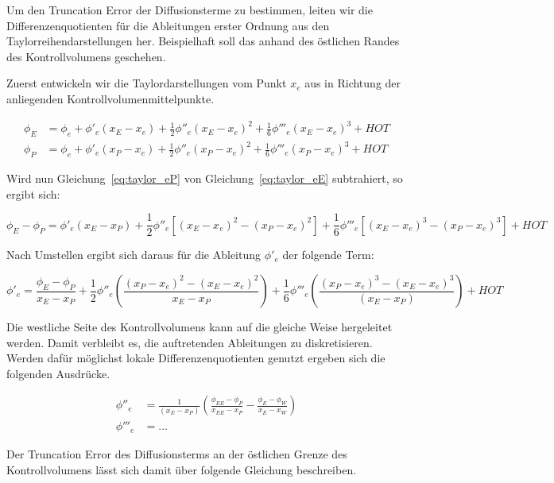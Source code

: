 \documentclass[10pt, ngerman,colorback,accentcolor=tud2d]{tudreport}
\begin{document}
Um den Truncation Error der Diffusionsterme zu bestimmen, leiten wir die Differenzenquotienten
für die Ableitungen erster Ordnung aus den Taylorreihendarstellungen her. Beispielhaft
soll das anhand des östlichen Randes des Kontrollvolumens geschehen.

Zuerst entwickeln wir die Taylordarstellungen vom Punkt $x_e$ aus in Richtung der anliegenden
Kontrollvolumenmittelpunkte.

\begin{align}
  \phi_E &= \phi_e + \phi'_e(x_E-x_e)+\frac{1}{2}\phi''_e(x_E-x_e)^2
  +\frac{1}{6}\phi'''_e(x_E-x_e)^3+HOT
  \label{eq:taylor_eE}\\
  \phi_P &= \phi_e + \phi'_e(x_P-x_e)+\frac{1}{2}\phi''_e(x_P-x_e)^2
  +\frac{1}{6}\phi'''_e(x_P-x_e)^3+HOT
  \label{eq:taylor_eP}
\end{align}

Wird nun Gleichung~\ref{eq:taylor_eP} von Gleichung~\ref{eq:taylor_eE} subtrahiert, 
so ergibt sich:

\begin{equation*}
  \phi_E-\phi_P=\phi'_e(x_E-x_P)+
  \frac{1}{2}\phi''_e\left[{{(x_E-x_e)}^2-{(x_P-x_e)}^2}\right]+
  \frac{1}{6}\phi'''_e\left[{{(x_E-x_e)}^3-{(x_P-x_e)}^3}\right]+HOT
\end{equation*}

Nach Umstellen ergibt sich daraus für die Ableitung $\phi'_e$ der folgende Term:

\begin{equation}
  \phi'_e = \frac{\phi_E-\phi_P}{x_E-x_P}+\frac{1}{2}\phi''_e
\left({\frac{{(x_P-x_e)}^2-{(x_E-x_e)}^2}{x_E-x_P}}\right)+
\frac{1}{6} \phi'''_e \left({\frac{{(x_P-x_e)}^3-{(x_E-x_e)}^3}{(x_E-x_P)}}\right)+HOT
\end{equation}


Die westliche Seite des Kontrollvolumens kann auf die gleiche Weise hergeleitet werden.
Damit verbleibt es, die auftretenden Ableitungen zu diskretisieren. Werden dafür
möglichst lokale Differenzenquotienten genutzt ergeben sich die folgenden Ausdrücke.

\begin{align*}
  \phi''_e &= \frac{1}{(x_E-x_P)}\left({
\frac{\phi_{EE}-\phi_P}{x_{EE}-x_P}-\frac{\phi_E-\phi_W}{x_E-x_W}}\right)\\
 \phi'''_e &= \dots
\end{align*}


Der Truncation Error des Diffusionsterms an der östlichen Grenze des Kontrollvolumens
lässt sich damit über folgende Gleichung beschreiben.
\end{document}
